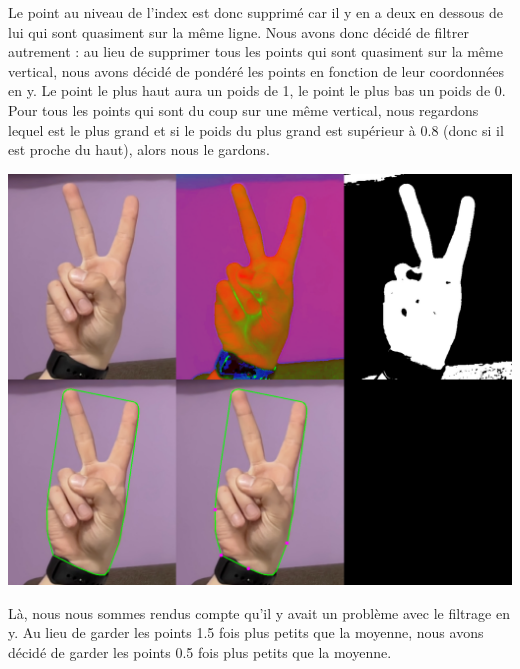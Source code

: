 \documentclass[11pt]{article}
\begin{document}
Le point au niveau de l'index est donc supprimé car il y en a deux en dessous de lui qui sont quasiment sur la même ligne. Nous avons donc décidé de filtrer autrement : au lieu de supprimer tous les points qui sont quasiment sur la même vertical, nous avons décidé de pondéré les points en fonction de leur coordonnées en y. Le point le plus haut aura un poids de 1, le point le plus bas un poids de 0. Pour tous les points qui sont du coup sur une même vertical, nous regardons lequel est le plus grand et si le poids du plus grand est supérieur à 0.8 (donc si il est proche du haut), alors nous le gardons. \bigbreak

\begin{center}
    \includegraphics[width=\textwidth]{images/res_2_convex_hull_filter_1_y_2_x.png}
    \label{fig:res_2_convex_hull_filter_1_y_2_x}
\end{center}

Là, nous nous sommes rendus compte qu'il y avait un problème avec le filtrage en y. Au lieu de garder les points 1.5 fois plus petits que la moyenne, nous avons décidé de garder les points 0.5 fois plus petits que la moyenne. \bigbreak
\end{document}

